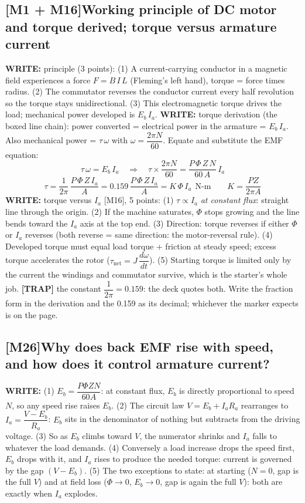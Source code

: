 \documentclass[11pt]{article}
\newcommand{\q}[2]{\subsection*{\color{copper}#1\quad\color{iron}#2}}
\newcommand{\w}[1]{\textbf{\color{copper}WRITE:} #1}
\newcommand{\tr}[1]{\textbf{\color{red}[TRAP]} #1}
\begin{document}
\q{[M1 + M16]}{Working principle of DC motor and torque derived; torque versus armature current}
\w{principle (3 points):} (1) A current-carrying conductor in a magnetic field experiences a force $F = B\, I\, L$ (Fleming's left hand), torque = force times radius. (2) The commutator reverses the conductor current every half revolution so the torque stays unidirectional. (3) This electromagnetic torque drives the load; mechanical power developed is $E_b\, I_a$.
\w{torque derivation (the boxed line chain):} power converted = electrical power in the armature = $E_b\, I_a$. Also mechanical power = $\tau\, \omega$ with $\omega = \dfrac{2\pi N}{60}$. Equate and substitute the EMF equation:
\[
\tau\, \omega = E_b\, I_a \quad\Longrightarrow\quad \tau \times \dfrac{2\pi N}{60} = \dfrac{P\,\Phi\, Z\, N}{60\, A}\, I_a
\]
\[
\boxed{\tau = \dfrac{1}{2\pi}\,\dfrac{P\,\Phi\, Z\, I_a}{A} = 0.159\,\dfrac{P\,\Phi\, Z\, I_a}{A} = K\,\Phi\, I_a\ \ \text{N-m}}
\qquad K = \dfrac{P Z}{2\pi A}
\]
\w{torque versus $I_a$ [M16], 5 points:} (1) $\tau \propto I_a$ \emph{at constant flux}: straight line through the origin. (2) If the machine saturates, $\Phi$ stops growing and the line bends toward the $I_a$ axis at the top end. (3) Direction: torque reverses if either $\Phi$ or $I_a$ reverses (both reverse = same direction: the motor-reversal rule). (4) Developed torque must equal load torque + friction at steady speed; excess torque accelerates the rotor ($\tau_{\text{net}} = J\,\dfrac{d\omega}{dt}$). (5) Starting torque is limited only by the current the windings and commutator survive, which is the starter's whole job.
\tr{the constant $\dfrac{1}{2\pi} = 0.159$: the deck quotes both. Write the fraction form in the derivation and the 0.159 as its decimal; whichever the marker expects is on the page.}

\q{[M26]}{Why does back EMF rise with speed, and how does it control armature current?}
\w{(1) $E_b = \dfrac{P \Phi Z N}{60 A}$: at constant flux, $E_b$ is directly proportional to speed $N$, so any speed rise raises $E_b$. (2) The circuit law $V = E_b + I_a R_a$ rearranges to $I_a = \dfrac{V - E_b}{R_a}$: $E_b$ sits in the denominator of nothing but subtracts from the driving voltage. (3) So as $E_b$ climbs toward $V$, the numerator shrinks and $I_a$ falls to whatever the load demands. (4) Conversely a load increase drops the speed first, $E_b$ drops with it, and $I_a$ rises to produce the needed torque: current is governed by the gap $(V - E_b)$. (5) The two exceptions to state: at starting ($N = 0$, gap is the full $V$) and at field loss ($\Phi \rightarrow 0$, $E_b \rightarrow 0$, gap is again the full $V$): both are exactly when $I_a$ explodes.}
\end{document}
